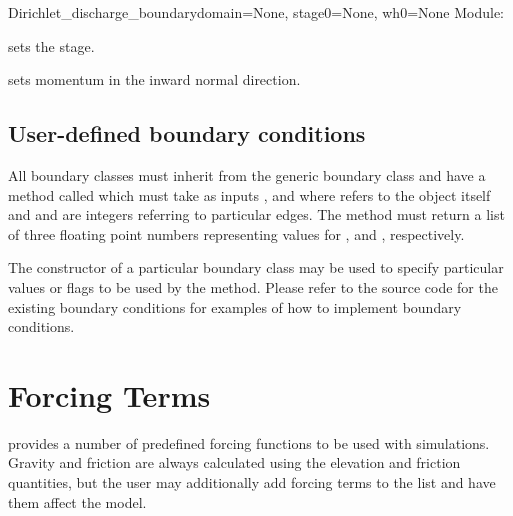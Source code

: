 \documentclass{manual}
\begin{document}
\begin{classdesc}{Dirichlet_discharge_boundary}{domain=None, stage0=None, wh0=None}
Module: 

 sets the stage.

 sets momentum in the inward normal direction.
\end{classdesc}

\subsection{User-defined boundary conditions}
\label{sec:roll your own}

All boundary classes must inherit from the generic boundary class
 and have a method called  which must
take as inputs ,  and  where  refers to the
object itself and  and  are integers referring to
particular edges. The method must return a list of three floating point
numbers representing values for ,
 and , respectively.

The constructor of a particular boundary class may be used to specify
particular values or flags to be used by the  method.
Please refer to the source code for the existing boundary conditions
for examples of how to implement boundary conditions.


\section{Forcing Terms}
\label{sec:forcing terms}

\anuga provides a number of predefined forcing functions to be used with simulations.
Gravity and friction are always calculated using the elevation and friction quantities,
but the user may additionally add forcing terms to the list
 and have them affect the model.
\end{document}
